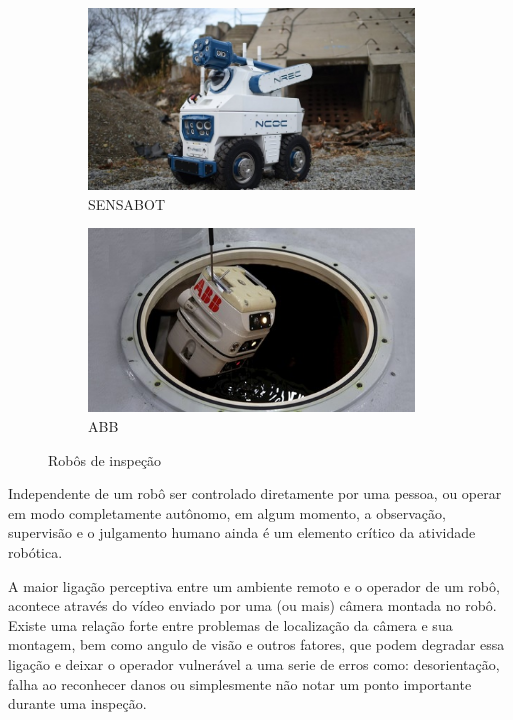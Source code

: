 \begin{figure}[H]
	\centering
	\begin{subfigure}{.5\textwidth}
		\includegraphics[width=0.95\textwidth]{figuras/sensabot.jpg}
		\caption{SENSABOT}
		\label{fig:sensabot}
	\end{subfigure}%
	\begin{subfigure}{.5\textwidth}
		\includegraphics[width=0.95\textwidth]{figuras/abb.jpg}
		\caption{ABB}
		\label{fig:abb}
	\end{subfigure}
	\caption{Robôs de inspeção}
\end{figure}

Independente de um robô ser controlado diretamente por uma pessoa, ou operar em modo completamente autônomo, em algum momento, a observação, supervisão e o julgamento humano ainda é um elemento crítico da atividade robótica.\par

A maior ligação perceptiva entre um ambiente remoto e o operador de um robô, acontece através do vídeo enviado por uma (ou mais) câmera montada no robô. Existe uma relação forte entre problemas de localização da câmera e sua montagem, bem como angulo de visão e outros fatores, que podem degradar essa ligação e deixar o operador vulnerável a uma serie de erros como: desorientação, falha ao reconhecer danos ou simplesmente não notar um ponto importante durante uma inspeção.\par

